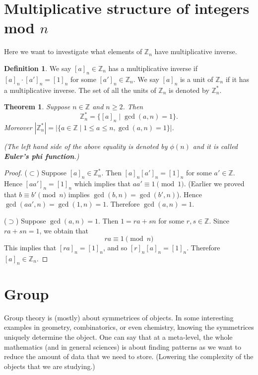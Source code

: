 \documentclass{article}
\theoremstyle{plain}
\newtheorem{theorem}{Theorem}
\theoremstyle{definition}
\newtheorem*{definition}{Definition}
\begin{document}





\section{Multiplicative structure of integers mod $n$}
Here we want to investigate what elements of $\mathbb{Z}_n$
have multiplicative inverse.
\begin{definition}
    We say $[a]_n\in\mathbb{Z}_n$ has a multiplicative inverse
    if $[a]_n\cdot [a']_n=[1]_n$ for some $[a']_n\in\mathbb{Z}_n$. We say $[a]_n$
    is a unit of $\mathbb{Z}_n$ if it has a multiplicative 
    inverse. The set of all the units of $\mathbb{Z}_n$ is denoted
    by $\mathbb{Z}_n^*$.
\end{definition}

\begin{theorem}
    Suppose $n\in\mathbb{Z}$ and $n\geq 2$. Then
    \[\mathbb{Z}_n^*=\{[a]_n\mid \gcd(a,n)=1\}.\]
    Moreover $|\mathbb{Z}_n^*|=|\{a\in\mathbb{Z}\mid 1\leq a\leq n,\gcd(a,n)=1\}|$.

    (The left hand side of the above equality is denoted
    by $\phi(n)$ and it is called \textbf{Euler's phi function}.)
\end{theorem}

\begin{proof}
    ($\subset$) Suppose $[a]_n\in\mathbb{Z}_n^*$. Then $[a]_n[a']_n=[1]_n$
    for some $a'\in\mathbb{Z}$. Hence $[aa']_n=[1]_n$ which implies
    that $aa'\equiv 1\pmod 1$. (Earlier we proved that $b\equiv b'\pmod n$
    implies $\gcd(b,n)=\gcd(b',n)$). Hence $\gcd(aa',n)=\gcd(1,n)=1$.
    Therefore $\gcd(a,n)=1$.

    ($\supset$) Suppose $\gcd(a,n)=1$. Then $1=ra+sn$
    for some $r,s\in\mathbb{Z}$. Since $ra+sn=1$, we obtain that
    \[ra\equiv 1\pmod n\]
    This implies that $[ra]_n=[1]_n$, and so 
    $[r]_n[a]_n=[1]_n$. Therefore $[a]_n\in\mathbb{Z}_n$.
\end{proof}

\section{Group}
Group theory is (mostly) about symmetrices of objects.
In some interesting examples in geometry, combinatorics,
or even chemistry, knowing the symmetrices uniquely 
determine the object. One can say that at a meta-level,
the whole mathematics (and in general sciences) is about
finding patterns as we want to reduce the amount of
data that we need to store. (Lowering the complexity
of the objects that we are studying.)
\end{document}
